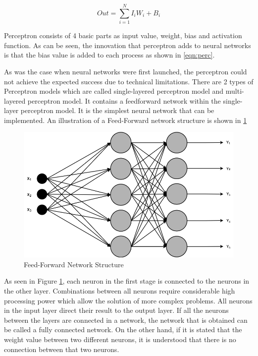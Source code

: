 \begin{equation}
\label{eqn:perc}
    Out = \sum\limits_{i=1}^{N}{I_i W_i+B_i}
\end{equation}

Perceptron consists of 4 basic parts as input value, weight, bias and activation function. As can be seen, the innovation that perceptron adds to neural networks is that the bias value is added to each process as shown in \ref{eqn:perc}.

As was the case when neural networks were first launched, the perceptron could not achieve the expected success due to technical limitations. There are 2 types of Perceptron models which are called single-layered perceptron model and multi-layered perceptron model. It contains a feedforward network within the single-layer perceptron model. It is the simplest neural network that can be implemented. An illustration of a Feed-Forward network structure is shown in \ref{fig:feed-forwardl}

\begin{figure}[h!]
    \centering
    \includegraphics[scale=0.45]{figures/chapter3/FeedForward.png}
    \vspace*{5mm}
    \caption{Feed-Forward Network Structure}
    \label{fig:feed-forwardl}
\end{figure}

As seen in Figure \ref{fig:feed-forwardl}, each neuron in the first stage is connected to the neurons in the other layer. Combinations between all neurons require considerable high processing power which allow the solution of more complex problems. All neurons in the input layer direct their result to the output layer. If all the neurons between the layers are connected in a network, the network that is obtained can be called a fully connected network. On the other hand, if it is stated that the weight value between two different neurons, it is understood that there is no connection between that two neurons.

